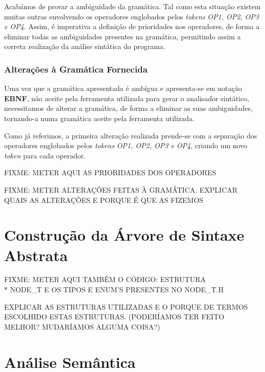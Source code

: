 \documentclass[11pt,a4paper]{article}
\begin{document}
Acabámos de provar a ambiguidade da gramática. Tal como esta situação existem muitas outras envolvendo os operadores englobados pelos \emph{tokens} \emph{OP1, OP2, OP3 e OP4}. Assim, é imperativa a definição de prioridades nos operadores, de forma a eliminar todas as ambiguidades presentes na gramática, permitindo assim a correta realização da análise sintática do programa.

\subsubsection{Alterações à Gramática Fornecida}

Uma vez que a gramática apresentada é ambígua e apresenta-se em notação \textbf{EBNF}, não aceite pela ferramenta utilizada para gerar o analisador sintático, necessitamos de alterar a gramática, de forma a eliminar as suas ambiguidades, tornando-a numa gramática aceite pela ferramenta utilizada.

Como já referimos, a primeira alteração realizada prende-se com a separação dos operadores englobados pelos \emph{tokens} \emph{OP1, OP2, OP3 e OP4}, criando um novo \emph{token} para cada operador.

FIXME: METER AQUI AS PRIORIDADES DOS OPERADORES


FIXME: METER ALTERAÇÕES FEITAS À GRAMÁTICA. EXPLICAR QUAIS AS ALTERAÇÕES E PORQUE É QUE AS FIZEMOS

\pagebreak

\section{Construção da Árvore de Sintaxe Abstrata}

FIXME: METER AQUI TAMBÉM O CÓDIGO: ESTRUTURA \\* NODE\_T E OS TIPOS E ENUM'S PRESENTES NO NODE\_T.H

EXPLICAR AS ESTRUTURAS UTILIZADAS E O PORQUE DE TERMOS ESCOLHIDO ESTAS ESTRUTURAS. (PODERÍAMOS TER FEITO MELHOR? MUDARÍAMOS ALGUMA COISA?)

\pagebreak

\section{Análise Semântica}
\end{document}
